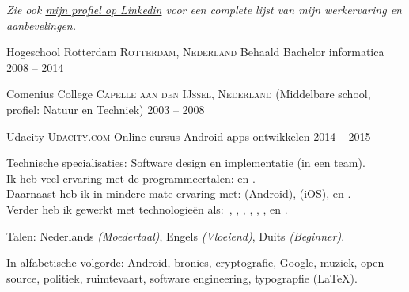 \documentclass[10pt,a4paper]{article}
\begin{document}
\begin{center}
  \emph{Zie ook \href{http://www.linkedin.com/in/frankkie12345}{mijn profiel op Linkedin} voor een complete lijst van mijn werkervaring en aanbevelingen.}
\end{center}


\spacedhrule{-0.2em}{-0.4em}


\headedsection
  {Hogeschool Rotterdam}
  {\textsc{Rotterdam, Nederland}} {%
  \headedsubsection
    {Behaald Bachelor informatica}
    {2008 -- 2014}
    {}
}

\headedsection
  {Comenius College}
  {\textsc{Capelle aan den IJssel, Nederland}} {%
  \headedsubsection
    { \textnormal{(Middelbare school, profiel: Natuur en Techniek)}}
    {2003 -- 2008} {}
}

\headedsection
  {Udacity}
  {\textsc{Udacity.com}} {
  \headedsection
  { \textnormal{Online cursus Android apps ontwikkelen}}
  {2014 -- 2015} 
  {}
  }

\spacedhrule{0.5em}{-0.4em}


\inlineheadsection  %
  {Technische specialisaties:}
  {Software design en implementatie (in een team). \\
  Ik heb veel ervaring met de programmeertalen:  en . \\
  Daarnaast heb ik in mindere mate ervaring met:  (Android),  (iOS),  en . \\
  Verder heb ik gewerkt met technologie\"en als:\ , , , , , , en .}

\inlineheadsection
  {Talen:}
  {Nederlands \emph{(Moedertaal)}, Engels \emph{(Vloeiend)}, Duits \emph{(Beginner)}.}


\spacedhrule{1.6em}{-0.4em}


\inlineheadsection
  {In alfabetische volgorde:}
  {Android, bronies, cryptografie, Google, muziek, open source, politiek, ruimtevaart, software engineering, typograpfie (\LaTeX).}
\end{document}
